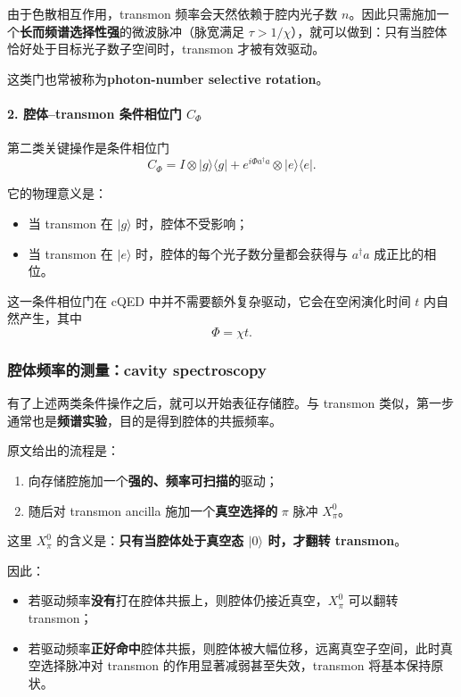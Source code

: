 \documentclass[12pt,a4paper,oneside]{ctexbook}
\begin{document}
由于色散相互作用，transmon 频率会天然依赖于腔内光子数 \(n\)。因此只需施加一个\textbf{长而频谱选择性强}的微波脉冲（脉宽满足 \(\tau>1/\chi\)），就可以做到：只有当腔体恰好处于目标光子数子空间时，transmon 才被有效驱动。

这类门也常被称为\textbf{photon-number selective rotation}。

\paragraph{2. 腔体--transmon 条件相位门 \(C_\Phi\)}
第二类关键操作是条件相位门
\begin{equation}
C_\Phi
=
I\otimes |g\rangle\langle g|
+
e^{i\Phi a^\dagger a}\otimes |e\rangle\langle e|.
\tag{86}
\end{equation}

它的物理意义是：
\begin{itemize}
    \item 当 transmon 在 \(|g\rangle\) 时，腔体不受影响；
    \item 当 transmon 在 \(|e\rangle\) 时，腔体的每个光子数分量都会获得与 \(a^\dagger a\) 成正比的相位。
\end{itemize}

这一条件相位门在 cQED 中并不需要额外复杂驱动，它会在空闲演化时间 \(t\) 内自然产生，其中
\[
\Phi=\chi t.
\]

\subsubsection{腔体频率的测量：cavity spectroscopy}

有了上述两类条件操作之后，就可以开始表征存储腔。与 transmon 类似，第一步通常也是\textbf{频谱实验}，目的是得到腔体的共振频率。

原文给出的流程是：
\begin{enumerate}
    \item 向存储腔施加一个\textbf{强的、频率可扫描的}驱动；
    \item 随后对 transmon ancilla 施加一个\textbf{真空选择的} \(\pi\) 脉冲 \(X_\pi^0\)。
\end{enumerate}

这里 \(X_\pi^0\) 的含义是：\textbf{只有当腔体处于真空态 \(|0\rangle\) 时，才翻转 transmon}。

因此：
\begin{itemize}
    \item 若驱动频率\textbf{没有}打在腔体共振上，则腔体仍接近真空，\(X_\pi^0\) 可以翻转 transmon；
    \item 若驱动频率\textbf{正好命中}腔体共振，则腔体被大幅位移，远离真空子空间，此时真空选择脉冲对 transmon 的作用显著减弱甚至失效，transmon 将基本保持原状。
\end{itemize}
\end{document}
